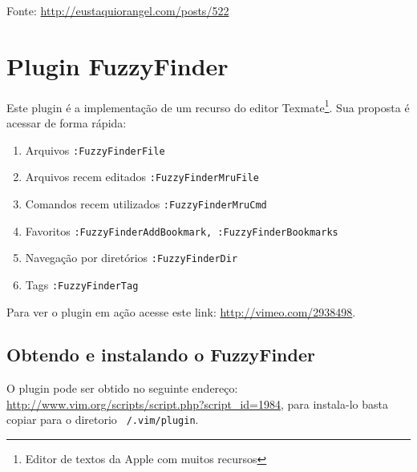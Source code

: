 Fonte: \url{http://eustaquiorangel.com/posts/522}

\section{Plugin FuzzyFinder}
\label{sec:Plugin FuzzyFinder}
                                                                       
Este plugin é a implementação de um recurso do editor 
Texmate\footnote{Editor de textos da Apple com muitos recursos}.
Sua proposta é acessar de forma rápida:


\begin{enumerate}
\item Arquivos \verb|:FuzzyFinderFile|
\item Arquivos recem editados \verb|:FuzzyFinderMruFile|
\item Comandos recem utilizados \verb|:FuzzyFinderMruCmd|
\item Favoritos \verb|:FuzzyFinderAddBookmark, :FuzzyFinderBookmarks|
\item Navegação por diretórios \verb|:FuzzyFinderDir|
\item Tags {\tt :FuzzyFinderTag}
\end{enumerate}

Para ver o plugin em ação acesse este link: 
\url{http://vimeo.com/2938498}.

\subsection{Obtendo e instalando o FuzzyFinder}
O plugin pode ser obtido no seguinte endereço: 
\url{http://www.vim.org/scripts/script.php?script_id=1984},
para instala-lo basta copiar para o diretorio 
{\tt ~/.vim/plugin}.



